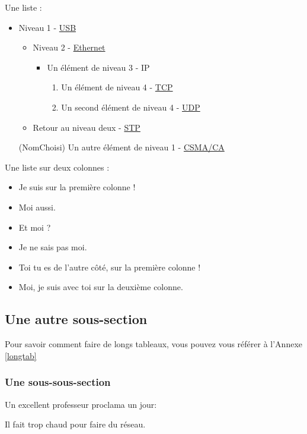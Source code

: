 Une liste :
\begin{itemize} %
    \item Niveau 1 - \href{https://fr.wikipedia.org/wiki/USB}{USB}
    \begin{itemize}
        \item Niveau 2 - \href{https://fr.wikipedia.org/wiki/Ethernet}{Ethernet}
        \begin{itemize}
            \item Un élément de niveau 3 - IP
            \begin{enumerate} %
                \item Un élément de niveau 4 - \href{https://en.wikipedia.org/wiki/TCP}{TCP}
                \item Un second élément de niveau 4 - \href{https://en.wikipedia.org/wiki/UDP}{UDP}
            \end{enumerate}
        \end{itemize}
        \item Retour au niveau deux - \href{https://fr.wikipedia.org/wiki/Spanning_Tree_Protocol}{STP}
    \end{itemize}
    \item[(NomChoisi)] Un autre élément de niveau 1 - \href{https://fr.wikipedia.org/wiki/Carrier_Sense_Multiple_Access_with_Collision_Avoidance}{CSMA/CA}
\end{itemize}

Une liste sur deux colonnes :
\begin{itemize}[twocol]
    \item Je suis sur la première colonne !
    \item Moi aussi.
    \item Et moi ?
    \item Je ne sais pas moi.
    \item Toi tu es de l'autre côté, sur la première colonne !
    \item Moi, je suis avec toi sur la deuxième colonne.
\end{itemize}


\subsection{Une autre sous-section}
Pour savoir comment faire de longs tableaux, vous pouvez vous référer à l'Annexe \ref{longtab}
\subsubsection{Une sous-sous-section}
Un excellent professeur proclama un jour:
\begin{center}
Il fait trop chaud pour faire du réseau.
\end{center}

